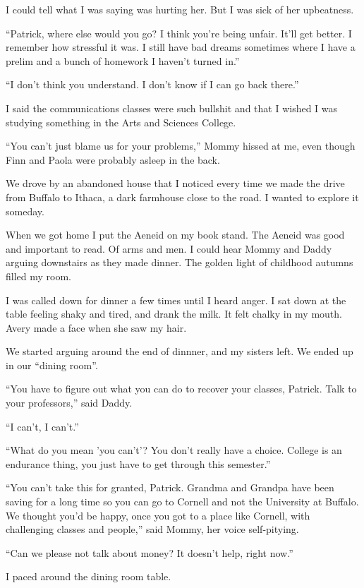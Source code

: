 I could tell what I was saying was hurting her.  But I was sick of her
upbeatness.

``Patrick, where else would you go?  I think you're being unfair.  It'll get
better.  I remember how stressful it was.  I still have bad dreams sometimes
where I have a prelim and a bunch of homework I haven't turned in.''

``I don't think you understand.  I don't know if I can go back there.''

I said the communications classes were such bullshit and that I wished I was
studying something in the Arts and Sciences College.  

``You can't just blame us for your problems,'' Mommy hissed at me, even though Finn
and Paola were probably asleep in the back.

We drove by an abandoned house that I noticed every time we made the drive from
Buffalo to Ithaca, a dark farmhouse close to the road.  I wanted to
explore it someday.

When we got home I put the Aeneid on my book stand.  The Aeneid was good and
important to read.  Of arms and men.  I could hear Mommy and Daddy arguing
downstairs as they made dinner.   The golden light of childhood autumns filled
my room.

I was called down for dinner a few times until I heard anger.  I sat down at the
table feeling shaky and tired, and drank the milk.  It felt chalky in my mouth.
Avery made a face when she saw my hair.

We started arguing around the end of dinnner, and my sisters left.  We ended up
in our ``dining room''.

``You have to figure out what you can do to recover your classes, Patrick.  Talk
to your professors,'' said Daddy.

``I can't, I can't.'' 

``What do you mean 'you can't'?  You don't really have a choice.  College is an
endurance thing, you just have to get through this semester.''

``You can't take this for granted, Patrick.  Grandma and Grandpa have been saving
for a long time so you can go to Cornell and not the University at Buffalo.  We
thought you'd be happy, once you got to a place like Cornell, with challenging
classes and people,'' said Mommy, her voice self-pitying.

``Can we please not talk about money?  It doesn't help, right now.''

I paced around the dining room table.

